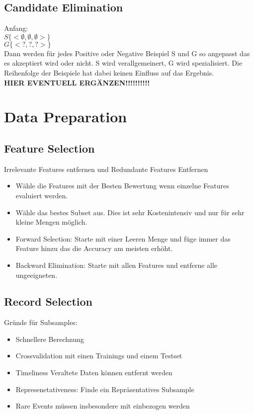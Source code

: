 \documentclass[a4paper]{scrartcl}
\begin{document}
\subsection{Candidate Elimination}
Anfang:\\
$S\{<\emptyset, \emptyset, \emptyset>\}$\\
$G\{<?, ?,?>\}$\\
Dann werden für jedes Positive oder Negative Beispiel S und G so angepasst das es akzeptiert wird oder nicht. S wird verallgemeinert, G wird spezialisiert. Die Reihenfolge der Beispiele hat dabei keinen Einfluss auf das Ergebnis.\\

\textbf{HIER EVENTUELL ERGÄNZEN!!!!!!!!!!}

\section{Data Preparation}
\subsection{Feature Selection}
Irrelevante Features entfernen und Redundante Features Entfernen\\
\begin{itemize}
\item Wähle die Features mit der Besten Bewertung wenn einzelne Features evaluiert werden.
\item Wähle das bestes Subset aus. Dies ist sehr Kostenintensiv und nur für sehr kleine Mengen möglich.
\item Forward Selection: Starte mit einer Leeren Menge und füge immer das Feature hinzu das die Accuracy am meisten erhöht.
\item Backward Elimination: Starte mit allen Features und entferne alle ungeeigneten.
\end{itemize}
\subsection{Record Selection}
Gründe für Subsamples:\\
\begin{itemize}
\item Schnellere Berechnung
\item Crossvalidation mit einen Trainings und einem Testset
\item Timeliness Veraltete Daten können entfernt werden
\item Represenetativeness: Finde ein Repräsentatives Subsample
\item Rare Events müssen insbesondere mit einbezogen werden
\end{itemize}
\end{document}

